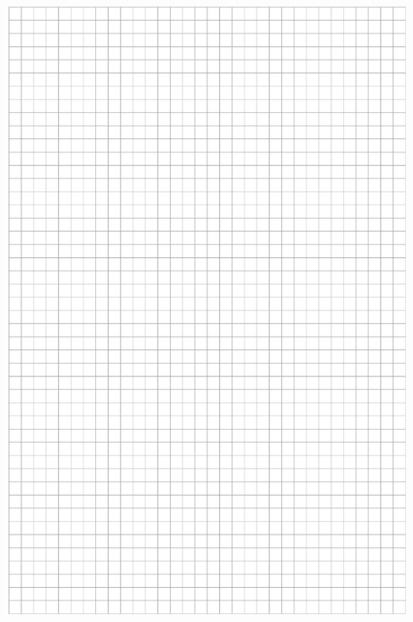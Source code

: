 \documentclass[10pt]{article}
\begin{document}
\includegraphics[max width=\textwidth, center]{2024_11_21_f1ecc00f5c4ab21f0d04g-24}
\end{document}
